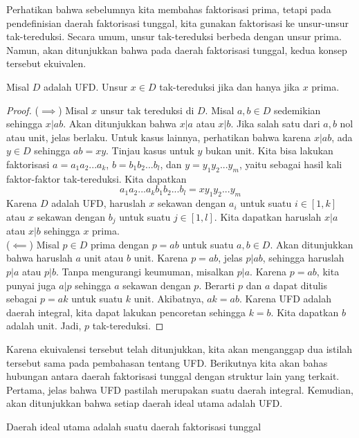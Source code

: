 	Perhatikan bahwa sebelumnya kita membahas faktorisasi prima, tetapi pada pendefinisian daerah faktorisasi tunggal, kita gunakan faktorisasi ke unsur-unsur tak-tereduksi. Secara umum, unsur tak-tereduksi berbeda dengan unsur prima. Namun, akan ditunjukkan bahwa pada daerah faktorisasi tunggal, kedua konsep tersebut ekuivalen.
	\begin{theorem}
	Misal $D$ adalah UFD. Unsur $x \in D$ tak-tereduksi jika dan hanya jika $x$ prima.
	\end{theorem}
	\begin{proof}
		($\implies$) Misal $x$ unsur tak tereduksi di $D$. Misal $a,b \in D$ sedemikian  sehingga $x|ab$. Akan ditunjukkan bahwa $x | a$ atau $x|b$. Jika salah satu dari $a,b$ nol atau unit, jelas berlaku. Untuk kasus lainnya, perhatikan bahwa karena $x | ab$, ada $y \in D$ sehingga $ab = xy$. Tinjau kasus untuk $y$ bukan unit. Kita bisa lakukan faktorisasi $a = a_1 a_2 ... a_k$, $b = b_1 b_2 ... b_l$, dan $y = y_1 y_2 ... y_m$, yaitu sebagai hasil kali faktor-faktor tak-tereduksi. Kita dapatkan $$a_1 a_2 ... a_k b_1 b_2 ... b_l = xy_1 y_2 ... y_m$$Karena $D$ adalah UFD, haruslah $x$ sekawan dengan $a_i$ untuk suatu $i \in [1,k]$ atau $x$ sekawan dengan $b_j$ untuk suatu $j \in [1,l]$. Kita dapatkan haruslah $x | a$ atau $x | b$ sehingga $x$ prima.\\
		
		($\impliedby$) Misal $p \in D$ prima dengan $p = ab$ untuk suatu $a,b \in D$. Akan ditunjukkan bahwa haruslah $a$ unit atau $b$ unit. Karena $p = ab$, jelas $p | ab$, sehingga haruslah $p | a$ atau $p | b$. Tanpa mengurangi keumuman, misalkan $p | a$. Karena $p = ab$, kita punyai juga $a | p$ sehingga $a$ sekawan dengan $p$. Berarti $p$ dan $a$ dapat ditulis sebagai $p = ak$ untuk suatu $k$ unit. Akibatnya, $ak = ab$. Karena UFD adalah daerah integral, kita dapat lakukan pencoretan sehingga $k = b$. Kita dapatkan $b$ adalah unit. Jadi, $p$ tak-tereduksi.
	\end{proof}
	Karena ekuivalensi tersebut telah ditunjukkan, kita akan menganggap dua istilah tersebut sama pada pembahasan tentang UFD. Berikutnya kita akan bahas hubungan antara daerah faktorisasi tunggal dengan struktur lain yang terkait. Pertama, jelas bahwa UFD pastilah merupakan suatu daerah integral. Kemudian, akan ditunjukkan bahwa setiap daerah ideal utama adalah UFD.
	\begin{theorem}
		Daerah ideal utama adalah suatu daerah faktorisasi tunggal
	\end{theorem}
